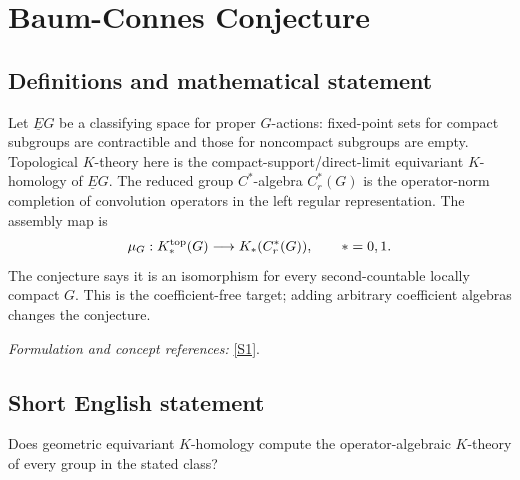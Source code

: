 \documentclass[11pt]{article}
\newcommand{\sref}[2]{\hyperlink{source:#1:#2}{[S#2]}}
\newif\ifshowcatalogue
\newcommand{\cataloguescope}[1]{\ifshowcatalogue
 \paragraph{Exact scope in the supplied catalogue.}
 \begin{quote}\small #1\end{quote}\fi}
\begin{document}
\setcounter{section}{0}
\clearpage
\section*{\texorpdfstring{Baum-Connes Conjecture}{Baum-Connes Conjecture}}\label{1479}
\subsection{Definitions and mathematical statement}
Let $\underline EG$ be a classifying space for proper $G$-actions: fixed-point sets for compact subgroups are contractible and those for noncompact subgroups are empty. Topological $K$-theory here is the compact-support/direct-limit equivariant $K$-homology of $\underline EG$. The reduced group $C^*$-algebra $C_r^*(G)$ is the operator-norm completion of convolution operators in the left regular representation. The assembly map is
\[
 \mu_G:K_*^{\rm top}(G)\longrightarrow K_*(C_r^*(G)),\qquad *=0,1.
\]
The conjecture says it is an isomorphism for every second-countable locally compact $G$. This is the coefficient-free target; adding arbitrary coefficient algebras changes the conjecture.
\par\smallskip\textit{Formulation and concept references:} \sref{1479}{1}.
\cataloguescope{Prove the Baum-Connes conjecture for every second-countable locally compact group G: the assembly map K\_top(G) \ensuremath{\to} K(C*\_r(G)) from the topological K-theory of the group, built from the classifying space for proper actions, to the K-theory of the reduced group C*-algebra is an isomorphism.}
\subsection{Short English statement}
Does geometric equivariant $K$-homology compute the operator-algebraic $K$-theory of every group in the stated class?
\end{document}
